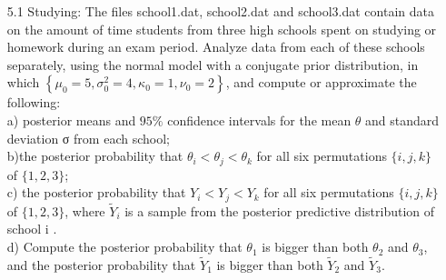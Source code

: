 \documentclass[a4paper]{article}
\begin{document}
\setlength{\leftskip}{20pt}

 \maketitle




\begin{enumerate} %

 \item[5.1] 
Studying: The files school1.dat, school2.dat and school3.dat contain data on the amount of time students from three high schools spent on studying or homework during an exam period. Analyze data from each of these schools separately, using the normal model with a conjugate prior distribution, in which $\left\{\mu_{0}=5, \sigma_{0}^{2}=4, \kappa_{0}=1, \nu_{0}=2\right\}$, and compute or approximate the following:\\
a) posterior means and $95\%$ confidence intervals for the mean $\theta$ and standard deviation σ from each school;\\
b)the posterior probability that $ \theta_{i}<\theta_{j}<\theta_{k}$ for all six permutations  $ \{i, j, k\}$ of $\{1,2,3\}$;\\
c) the posterior probability that $ Y_{i}<Y_{j}<Y_{k}$ for all six permutations $ \{i, j, k\} $ of $\{1,2,3\}$,  where $ \tilde{Y}_{i}$  is a sample from the posterior predictive distribution of school  i . \\
d) Compute the posterior probability that  $\theta_{1}$ is bigger than both $ \theta_{2}$ and  $\theta_{3}$, and the posterior probability that $ \tilde{Y}_{1}$ is bigger than both $ \tilde{Y}_{2}
$ and $  \tilde{Y}_{3} $.



\end{enumerate}
\end{document}
